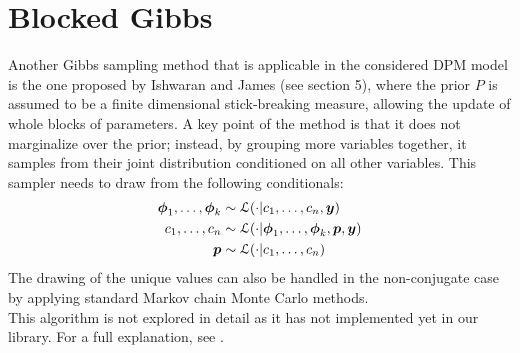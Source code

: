 \section{Blocked Gibbs}
Another Gibbs sampling method that is applicable in the considered DPM model is the one proposed by Ishwaran and James (see \cite{james} section 5), where the prior $P$ is assumed to be a finite dimensional stick-breaking measure, allowing the update of whole blocks of parameters.
A key point of the method is that it does not marginalize over the prior; instead, by grouping more variables together, it samples from their joint distribution conditioned on all other variables.
This sampler needs to draw from the following conditionals:
\begin{align}
	\boldsymbol\phi_1,\dots,\boldsymbol\phi_k &\sim \mathcal L(\cdot | c_1,\dots,c_n, \boldsymbol{y}) \nonumber \\
	c_1,\dots,c_n &\sim \mathcal L (\cdot | \boldsymbol\phi_1,\dots,\boldsymbol\phi_k,\boldsymbol{p}, \boldsymbol{y}) \nonumber \\
	\boldsymbol{p} &\sim \mathcal L (\cdot | c_1,\dots,c_n) \nonumber
\end{align}
The drawing of the unique values can also be handled in the non-conjugate case by applying standard Markov chain Monte Carlo methods. \\
This algorithm is not explored in detail as it has not implemented yet in our library.
For a full explanation, see \cite{james}.
